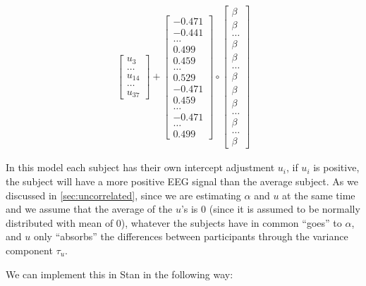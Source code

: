 \documentclass[12pt,]{krantz}
\theoremstyle{definition}
\theoremstyle{definition}
\theoremstyle{definition}
\theoremstyle{remark}
\begin{document}
\begin{equation}
\begin{aligned}
\begin{bmatrix}
u_{3} \\
\ldots \\
u_{14} \\
\ldots \\
u_{37 }
\end{bmatrix}
+
\begin{bmatrix}
{-0.471} \\
{-0.441} \\
\ldots \\
{0.499} \\
{0.459} \\
\ldots \\
{0.529} \\
{-0.471} \\
{0.459} \\
\ldots \\
{-0.471} \\
\ldots \\
{0.499 }
\end{bmatrix}
\circ
\begin{bmatrix}
\beta \\
\beta \\
\ldots \\
\beta \\
\beta \\
\ldots \\
\beta \\
\beta \\
\beta \\
\ldots \\
\beta \\
\ldots \\
\beta
\end{bmatrix}
\end{aligned}
\end{equation}

In this model each subject has their own intercept adjustment \(u_i\), if \(u_i\) is positive, the subject will have a more positive EEG signal than the average subject. As we discussed in \ref{sec:uncorrelated}, since we are estimating \(\alpha\) and \(u\) at the same time and we assume that the average of the \(u\)'s is 0 (since it is assumed to be normally distributed with mean of 0), whatever the subjects have in common ``goes'' to \(\alpha\), and \(u\) only ``absorbs'' the differences between participants through the variance component \(\tau_u\).

We can implement this in Stan in the following way:
\end{document}
